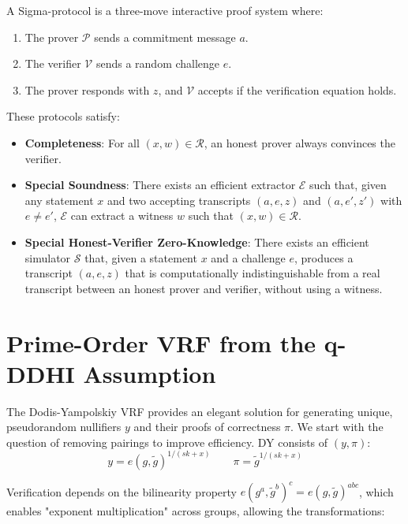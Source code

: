 A Sigma-protocol is a three-move interactive proof system where:
\begin{enumerate}
    \item The prover $\mathcal{P}$ sends a commitment message $a$.
    \item The verifier $\mathcal{V}$ sends a random challenge $e$.
    \item The prover responds with $z$, and $\mathcal{V}$ accepts if the verification equation holds.
\end{enumerate}
These protocols satisfy:
\begin{itemize}
    \item \textbf{Completeness}: For all $(x,w) \in \mathcal{R}$, an honest prover always convinces the verifier.
    \item \textbf{Special Soundness}: There exists an efficient extractor $\mathcal{E}$ such that, given any statement $x$ and two accepting transcripts $(a,e,z)$ and $(a,e',z')$ with $e \neq e'$, $\mathcal{E}$ can extract a witness $w$ such that $(x,w) \in \mathcal{R}$.
    \item \textbf{Special Honest-Verifier Zero-Knowledge}: There exists an efficient simulator $\mathcal{S}$ that, given a statement $x$ and a challenge $e$, produces a transcript $(a,e,z)$ that is computationally indistinguishable from a real transcript between an honest prover and verifier, without using a witness.
\end{itemize}












\section{Prime-Order VRF from the q-DDHI Assumption}\label{sec:pairing-free-vrf}

The Dodis-Yampolskiy \cite{hutchison_verifiable_2005} VRF provides an elegant solution for generating unique, pseudorandom nullifiers $y$ and their proofs of correctness $\pi$. We start with the question of removing pairings to improve efficiency. DY consists of $(y, \pi)$:
\[
y = e(g, \tilde{g})^{1/(sk+x)} \qquad \pi = \tilde{g}^{1/(sk+x)}
\]

Verification depends on the bilinearity property $e(g^a, \tilde{g}^b)^c = e(g, \tilde{g})^{abc}$, which enables "exponent multiplication" across groups, allowing the transformations:


